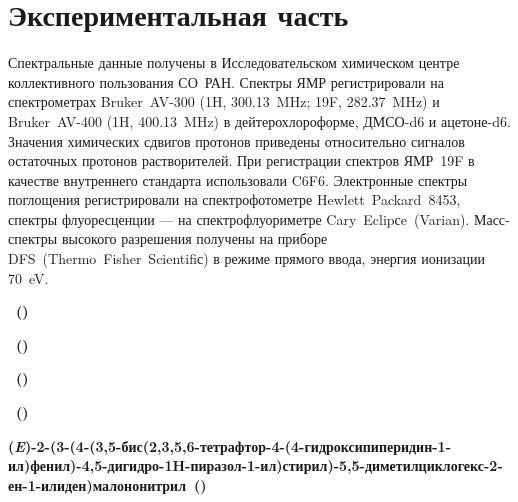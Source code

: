 \section{Экспериментальная часть}

Спектральные данные получены в Исследовательском химическом центре коллективного пользования СО~РАН. Спектры ЯМР регистрировали на спектрометрах Bruker~AV-300 (1H, \SI{300.13}{\mega\hertz}; 19F, \SI{282.37}{\mega\hertz}) и Bruker~AV-400 (1H, \SI{400.13}{\mega\hertz}) в дейтерохлороформе, ДМСО-d6 и ацетоне-d6. Значения химических сдвигов протонов приведены относительно сигналов остаточных протонов растворителей. При регистрации спектров ЯМР~19F в качестве внутреннего стандарта использовали C6F6. Электронные спектры поглощения регистрировали на спектрофотометре Hewlett~Packard~8453, спектры флуоресценции --- на спектрофлуориметре Cary~Eclipсe~(Varian). Масс-спектры высокого разрешения получены на приборе DFS~(Thermo~Fisher~Scientifiс) в режиме прямого ввода, энергия ионизации \SI{70}{\electronvolt}.

\textbf{~()}

\textbf{~()}

\textbf{~()}

\textbf{~()}

\textbf{(\textit{E})-2-(3-(4-(3,5-бис(2,3,5,6-тетрафтор-4-(4-гидроксипиперидин-1-ил)фенил)-4,5-дигидро-1H-пиразол-1-ил)стирил)-5,5-диметилциклогекс-2-ен-1-илиден)малононитрил~()}
